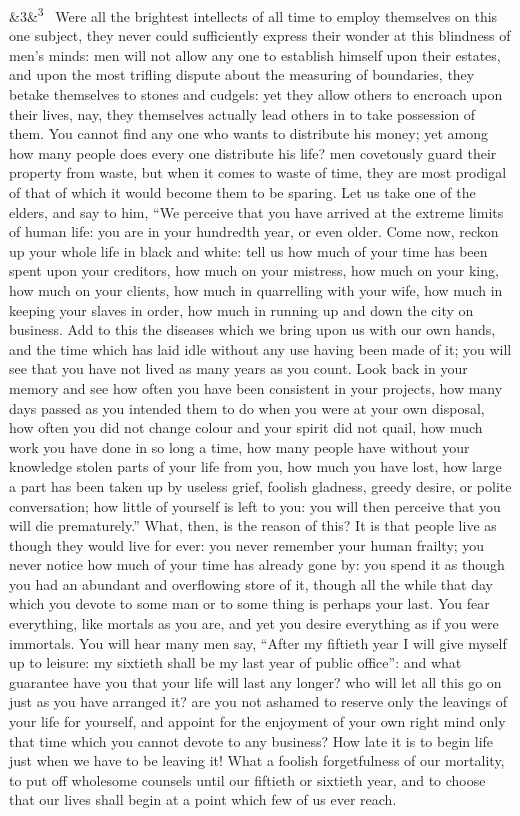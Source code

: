 \documentclass[12pt]{article}
\newcommand{\para}[1][]{\par\noindent\ifx&#1&\else\textsuperscript{\footnotesize #1}~\fi}
\begin{document}
\para[3] Were all the brightest intellects of all time to employ themselves on this one subject, they never could sufficiently express their wonder at this blindness of men’s minds: men will not allow any one to establish himself upon their estates, and upon the most trifling dispute about the measuring of boundaries, they betake themselves to stones and cudgels: yet they allow others to encroach upon their lives, nay, they themselves actually lead others in to take possession of them. You cannot find any one who wants to distribute his money; yet among how many people does every one distribute his life? men covetously guard their property from waste, but when it comes to waste of time, they are most prodigal of that of which it would become them to be sparing. Let us take one of the elders, and say to him, “We perceive that you have arrived at the extreme limits of human life: you are in your hundredth year, or even older. Come now, reckon up your whole life in black and white: tell us how much of your time has been spent upon your creditors, how much on your mistress, how much on your king, how much on your clients, how much in quarrelling with your wife, how much in keeping your slaves in order, how much in running up and down the city on business. Add to this the diseases which we bring upon us with our own hands, and the time which has laid idle without any use having been made of it; you will see that you have not lived as many years as you count. Look back in your memory and see how often you have been consistent in your projects, how many days passed as you intended them to do when you were at your own disposal, how often you did not change colour and your spirit did not quail, how much work you have done in so long a time, how many people have without your knowledge stolen parts of your life from you, how much you have lost, how large a part has been taken up by useless grief, foolish gladness, greedy desire, or polite conversation; how little of yourself is left to you: you will then perceive that you will die prematurely.” What, then, is the reason of this? It is that people live as though they would live for ever: you never remember your human frailty; you never notice how much of your time has already gone by: you spend it as though you had an abundant and overflowing store of it, though all the while that day which you devote to some man or to some thing is perhaps your last. You fear everything, like mortals as you are, and yet you desire everything as if you were immortals. You will hear many men say, “After my fiftieth year I will give myself up to leisure: my sixtieth shall be my last year of public office”: and what guarantee have you that your life will last any longer? who will let all this go on just as you have arranged it? are you not ashamed to reserve only the leavings of your life for yourself, and appoint for the enjoyment of your own right mind only that time which you cannot devote to any business? How late it is to begin life just when we have to be leaving it! What a foolish forgetfulness of our mortality, to put off wholesome counsels until our fiftieth or sixtieth year, and to choose that our lives shall begin at a point which few of us ever reach.
\end{document}
